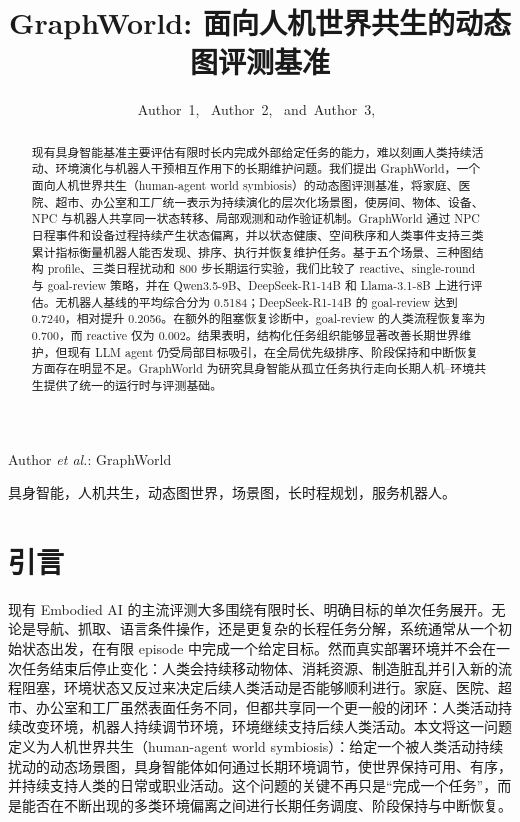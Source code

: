 \documentclass[journal]{IEEEtran}
\begin{document}
\title{GraphWorld: 面向人机世界共生的动态图评测基准}

\author{Author~1,~
        Author~2,~
        and~Author~3,~%
}

%
{Author \MakeLowercase{\textit{et al.}}: GraphWorld}

\maketitle

\begin{abstract}
现有具身智能基准主要评估有限时长内完成外部给定任务的能力，难以刻画人类持续活动、环境演化与机器人干预相互作用下的长期维护问题。我们提出 GraphWorld，一个面向人机世界共生（human-agent world symbiosis）的动态图评测基准，将家庭、医院、超市、办公室和工厂统一表示为持续演化的层次化场景图，使房间、物体、设备、NPC 与机器人共享同一状态转移、局部观测和动作验证机制。GraphWorld 通过 NPC 日程事件和设备过程持续产生状态偏离，并以状态健康、空间秩序和人类事件支持三类累计指标衡量机器人能否发现、排序、执行并恢复维护任务。基于五个场景、三种图结构 profile、三类日程扰动和 800 步长期运行实验，我们比较了 reactive、single-round 与 goal-review 策略，并在 Qwen3.5-9B、DeepSeek-R1-14B 和 Llama-3.1-8B 上进行评估。无机器人基线的平均综合分为 0.5184；DeepSeek-R1-14B 的 goal-review 达到 0.7240，相对提升 0.2056。在额外的阻塞恢复诊断中，goal-review 的人类流程恢复率为 0.700，而 reactive 仅为 0.002。结果表明，结构化任务组织能够显著改善长期世界维护，但现有 LLM agent 仍受局部目标吸引，在全局优先级排序、阶段保持和中断恢复方面存在明显不足。GraphWorld 为研究具身智能从孤立任务执行走向长期人机--环境共生提供了统一的运行时与评测基础。
\end{abstract}

\begin{IEEEkeywords}
具身智能，人机共生，动态图世界，场景图，长时程规划，服务机器人。
\end{IEEEkeywords}

\section{引言}
现有 Embodied AI 的主流评测大多围绕有限时长、明确目标的单次任务展开。无论是导航、抓取、语言条件操作，还是更复杂的长程任务分解，系统通常从一个初始状态出发，在有限 episode 中完成一个给定目标。然而真实部署环境并不会在一次任务结束后停止变化：人类会持续移动物体、消耗资源、制造脏乱并引入新的流程阻塞，环境状态又反过来决定后续人类活动是否能够顺利进行。家庭、医院、超市、办公室和工厂虽然表面任务不同，但都共享同一个更一般的闭环：人类活动持续改变环境，机器人持续调节环境，环境继续支持后续人类活动。本文将这一问题定义为人机世界共生（human-agent world symbiosis）：给定一个被人类活动持续扰动的动态场景图，具身智能体如何通过长期环境调节，使世界保持可用、有序，并持续支持人类的日常或职业活动。这个问题的关键不再只是“完成一个任务”，而是能否在不断出现的多类环境偏离之间进行长期任务调度、阶段保持与中断恢复。
\end{document}
